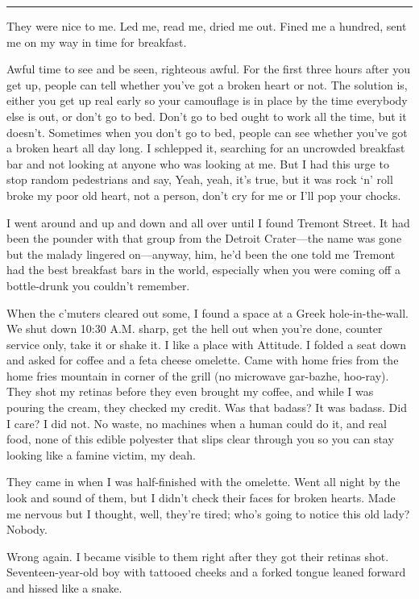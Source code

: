 \fancybreak{* * *}

They were nice to me. Led me, read me, dried me out. Fined me a hundred, sent me on my way in time for breakfast.

Awful time to see and be seen, righteous awful. For the first three hours after you get up, people can tell whether you've got a broken heart or not. The solution is, either you get up real early so your camouflage is in place by the time everybody else is out, or don't go to bed. Don't go to bed ought to work all the time, but it doesn't. Sometimes when you don't go to bed, people can see whether you've got a broken heart all day long. I schlepped it, searching for an uncrowded breakfast bar and not looking at anyone who was looking at me. But I had this urge to stop random pedestrians and say, Yeah, yeah, it's true, but it was rock ‘n' roll broke my poor old heart, not a person, don't cry for me or I'll pop your chocks.

I went around and up and down and all over until I found Tremont Street. It had been the pounder with that group from the Detroit Crater—the name was gone but the malady lingered on—anyway, him, he'd been the one told me Tremont had the best breakfast bars in the world, especially when you were coming off a bottle-drunk you couldn't remember.

When the c'muters cleared out some, I found a space at a Greek hole-in-the-wall. We shut down 10:30 A.M. sharp, get the hell out when you're done, counter service only, take it or shake it. I like a place with Attitude. I folded a seat down and asked for coffee and a feta cheese omelette. Came with home fries from the home fries mountain in corner of the grill (no microwave gar-bazhe, hoo-ray). They shot my retinas before they even brought my coffee, and while I was pouring the cream, they checked my credit. Was that badass? It was badass. Did I care? I did not. No waste, no machines when a human could do it, and real food, none of this edible polyester that slips clear through you so you can stay looking like a famine victim, my deah.

They came in when I was half-finished with the omelette. Went all night by the look and sound of them, but I didn't check their faces for broken hearts. Made me nervous but I thought, well, they're tired; who's going to notice this old lady? Nobody.

Wrong again. I became visible to them right after they got their retinas shot. Seventeen-year-old boy with tattooed cheeks and a forked tongue leaned forward and hissed like a snake.

